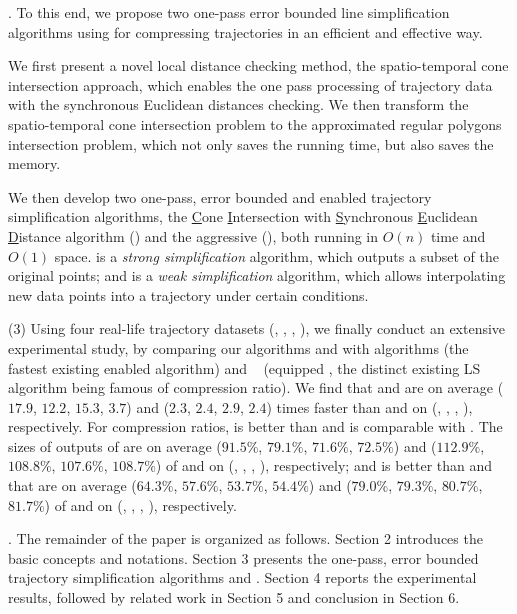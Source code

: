.
To this end, we propose two one-pass error bounded line simplification algorithms using \sed for compressing trajectories in an efficient and effective way.

 We first present a novel local distance checking method, \ie the spatio-temporal cone intersection approach, which enables the one pass processing of trajectory data with the synchronous Euclidean distances checking. We then transform the spatio-temporal cone intersection problem to the approximated regular polygons intersection problem, which not only saves the running time, but also saves the memory.

 We then develop two one-pass, error bounded and \sed enabled trajectory simplification algorithms, \ie the \underline{C}one \underline{I}ntersection with \underline{S}ynchronous \underline{E}uclidean \underline{D}istance algorithm (\cist) and the aggressive \cist (\cista), both running in $O(n)$ time and $O(1)$ space.
\cist is a \emph{strong simplification}\cite{Trajcevski:DDR} algorithm, which outputs a subset of the original points;
and \cista is a \emph{weak simplification}\cite{Trajcevski:DDR} algorithm, which allows interpolating new data points into a trajectory under certain conditions.


\stab (3) Using four real-life trajectory datasets (\truck, \sercar, \geolife, \pricar),
we finally conduct an extensive experimental study, by comparing our algorithms \cist and \cista with algorithms \squishe \cite{Muckell:Compression} (the \textcolor[rgb]{1.00,0.00,0.00}{fastest} existing \sed enabled \lsa algorithm) and \dps~\cite{Meratnia:Spatiotemporal} (\sed equipped \dpa, the distinct existing LS algorithm being famous of compression ratio).
%
We find that \cist and \cista are on average ($17.9$, $12.2$, $15.3$, \textcolor[rgb]{1.00,0.00,0.00}{{$3.7$}}) and ($2.3$, $2.4$, $2.9$, {$2.4$}) times faster than \dps and \squishe on (\truck, \sercar, \geolife, \pricar), respectively.
%
For compression ratios, \cist is better than \squishe and is comparable with \dps. The sizes of outputs of \cist are on average ($91.5\%$, $79.1\%$, $71.6\%$, {$72.5\%$}) and ($112.9\%$, $108.8\%$, $107.6\%$, $108.7\%$) of \squishe and \dps on (\truck, \sercar, \geolife, \pricar), respectively; and \cista is better than \squishe and \dps that are on average ($64.3\%$, $57.6\%$, $53.7\%$, {$54.4\%$}) and ($79.0\%$, $79.3\%$, $80.7\%$, $81.7\%$) of \squishe and \dps on (\truck, \sercar, \geolife, \pricar), respectively.


.
The remainder of the paper is organized as follows.
Section 2 introduces the basic concepts and notations.
Section 3 presents the one-pass, error bounded trajectory simplification algorithms \cist and \cista.
Section 4 reports the experimental results, followed by related work in
Section 5 and conclusion in Section 6.






